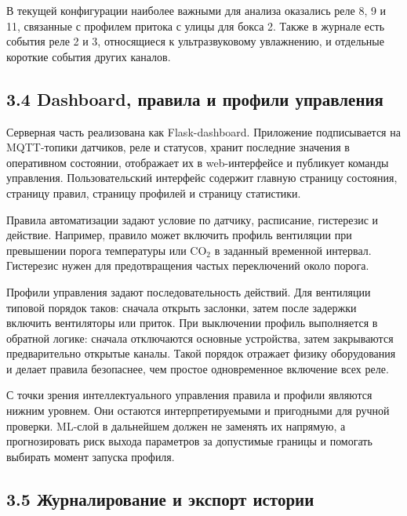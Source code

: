\documentclass[a4paper,14pt]{extarticle}
\begin{document}
В текущей конфигурации наиболее важными для анализа оказались реле 8, 9
и 11, связанные с профилем притока с улицы для бокса 2. Также в журнале
есть события реле 2 и 3, относящиеся к ультразвуковому увлажнению, и
отдельные короткие события других каналов.

\hypertarget{dashboard-ux43fux440ux430ux432ux438ux43bux430-ux438-ux43fux440ux43eux444ux438ux43bux438-ux443ux43fux440ux430ux432ux43bux435ux43dux438ux44f}{%
\subsection{3.4 Dashboard, правила и профили
управления}\label{dashboard-ux43fux440ux430ux432ux438ux43bux430-ux438-ux43fux440ux43eux444ux438ux43bux438-ux443ux43fux440ux430ux432ux43bux435ux43dux438ux44f}}

Серверная часть реализована как Flask-dashboard. Приложение
подписывается на MQTT-топики датчиков, реле и статусов, хранит последние
значения в оперативном состоянии, отображает их в web-интерфейсе и
публикует команды управления. Пользовательский интерфейс содержит
главную страницу состояния, страницу правил, страницу профилей и
страницу статистики.

Правила автоматизации задают условие по датчику, расписание, гистерезис
и действие. Например, правило может включить профиль вентиляции при
превышении порога температуры или CO\(_2\) в заданный временной
интервал. Гистерезис нужен для предотвращения частых переключений около
порога.

Профили управления задают последовательность действий. Для вентиляции
типовой порядок таков: сначала открыть заслонки, затем после задержки
включить вентиляторы или приток. При выключении профиль выполняется в
обратной логике: сначала отключаются основные устройства, затем
закрываются предварительно открытые каналы. Такой порядок отражает
физику оборудования и делает правила безопаснее, чем простое
одновременное включение всех реле.

С точки зрения интеллектуального управления правила и профили являются
нижним уровнем. Они остаются интерпретируемыми и пригодными для ручной
проверки. ML-слой в дальнейшем должен не заменять их напрямую, а
прогнозировать риск выхода параметров за допустимые границы и помогать
выбирать момент запуска профиля.

\hypertarget{ux436ux443ux440ux43dux430ux43bux438ux440ux43eux432ux430ux43dux438ux435-ux438-ux44dux43aux441ux43fux43eux440ux442-ux438ux441ux442ux43eux440ux438ux438}{%
\subsection{3.5 Журналирование и экспорт
истории}\label{ux436ux443ux440ux43dux430ux43bux438ux440ux43eux432ux430ux43dux438ux435-ux438-ux44dux43aux441ux43fux43eux440ux442-ux438ux441ux442ux43eux440ux438ux438}}
\end{document}
